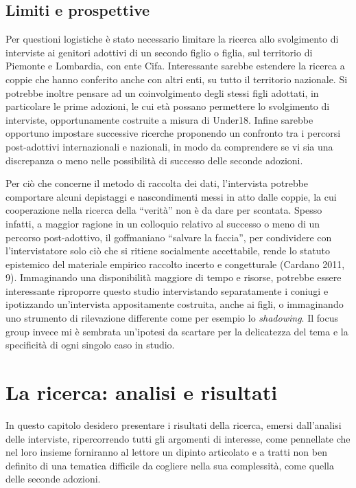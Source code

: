 \documentclass[12pt,oneside,svgnames]{memoir}
\begin{document}
\section{Limiti e prospettive}\label{limiti-e-prospettive}

Per questioni logistiche è stato necessario limitare la ricerca allo
svolgimento di interviste ai genitori adottivi di un secondo figlio o
figlia, sul territorio di Piemonte e Lombardia, con ente Cifa.
Interessante sarebbe estendere la ricerca a coppie che hanno conferito
anche con altri enti, su tutto il territorio nazionale. Si potrebbe
inoltre pensare ad un coinvolgimento degli stessi figli adottati, in
particolare le prime adozioni, le cui età possano permettere lo
svolgimento di interviste, opportunamente costruite a misura di Under18.
Infine sarebbe opportuno impostare successive ricerche proponendo un
confronto tra i percorsi post-adottivi internazionali e nazionali, in
modo da comprendere se vi sia una discrepanza o meno nelle possibilità
di successo delle seconde adozioni.

Per ciò che concerne il metodo di raccolta dei dati, l'intervista
potrebbe comportare alcuni depistaggi e nascondimenti messi in atto
dalle coppie, la cui cooperazione nella ricerca della ``verità'' non è
da dare per scontata. Spesso infatti, a maggior ragione in un colloquio
relativo al successo o meno di un percorso post-adottivo, il goffmaniano
``salvare la faccia'', per condividere con l'intervistatore solo ciò che
si ritiene socialmente accettabile, rende lo statuto epistemico del
materiale empirico raccolto incerto e congetturale (Cardano 2011, 9).
Immaginando una disponibilità maggiore di tempo e risorse, potrebbe
essere interessante riproporre questo studio intervistando separatamente
i coniugi e ipotizzando un'intervista appositamente costruita, anche ai
figli, o immaginando uno strumento di rilevazione differente come per
esempio lo \emph{shadowing}. Il focus group invece mi è sembrata
un'ipotesi da scartare per la delicatezza del tema e la specificità di
ogni singolo caso in studio.

\chapter{La ricerca: analisi e
risultati}\label{la-ricerca-analisi-e-risultati}

In questo capitolo desidero presentare i risultati della ricerca, emersi
dall'analisi delle interviste, ripercorrendo tutti gli argomenti di
interesse, come pennellate che nel loro insieme forniranno al lettore un
dipinto articolato e a tratti non ben definito di una tematica difficile
da cogliere nella sua complessità, come quella delle seconde adozioni.
\end{document}
